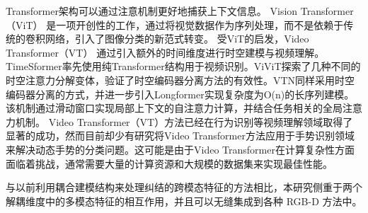 Transformer架构\cite{vaswani2017attention}可以通过注意机制更好地捕获上下文信息。
Vision Transformer（ViT） \cite{vit2021image}是一项开创性的工作，通过将视觉数据作为序列处理，而不是依赖于传统的卷积网络，引入了图像分类的新范式转变。
受ViT的启发，Video Transformer（VT）\cite{selva2023video} 通过引入额外的时间维度进行时空建模与视频理解。
TimeSformer\cite{bertasius2021space}率先使用纯Transformer结构用于视频识别。ViViT\cite{arnab2021vivit}探索了几种不同的时空注意力分解变体，验证了时空编码器分离方法的有效性。VTN\cite{neimark2021video}同样采用时空编码器分离的方式，并进一步引入Longformer实现复杂度为O(n)的长序列建模。
该机制通过滑动窗口实现局部上下文的自注意力计算，并结合任务相关的全局注意力机制。
Video Transformer（VT）方法已经在行为识别等视频理解领域取得了显著的成功，然而目前却少有研究将Video Transformer方法应用于手势识别领域来解决动态手势的分类问题。这可能是由于Video Transformer在计算复杂性方面面临着挑战，通常需要大量的计算资源和大规模的数据集来实现最佳性能\cite{khan2022transformers}。

与以前利用耦合建模结构来处理纠结的跨模态特征的方法相比，本研究侧重于两个解耦维度中的多模态特征的相互作用，并且可以无缝集成到各种 RGB-D 方法中。



